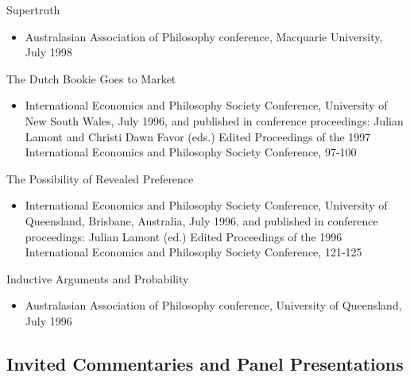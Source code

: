 \documentclass[
  10pt,
  letterpaper,
  DIV=11,
  numbers=noendperiod,
  twoside]{scrartcl}
\providecommand{\tightlist}{%
  \setlength{\itemsep}{0pt}\setlength{\parskip}{0pt}}\usepackage{longtable,booktabs,array}
\begin{document}
Supertruth

\begin{itemize}
\tightlist
\item
  Australasian Association of Philosophy conference, Macquarie
  University, July 1998
\end{itemize}

The Dutch Bookie Goes to Market

\begin{itemize}
\tightlist
\item
  International Economics and Philosophy Society Conference, University
  of New South Wales, July 1996, and published in conference
  proceedings: Julian Lamont and Christi Dawn Favor (eds.) Edited
  Proceedings of the 1997 International Economics and Philosophy Society
  Conference, 97-100
\end{itemize}

The Possibility of Revealed Preference

\begin{itemize}
\tightlist
\item
  International Economics and Philosophy Society Conference, University
  of Queensland, Brisbane, Australia, July 1996, and published in
  conference proceedings: Julian Lamont (ed.) Edited Proceedings of the
  1996 International Economics and Philosophy Society Conference,
  121-125
\end{itemize}

\newpage

Inductive Arguments and Probability

\begin{itemize}
\tightlist
\item
  Australasian Association of Philosophy conference, University of
  Queensland, July 1996
\end{itemize}

\subsection{Invited Commentaries and Panel
Presentations}\label{invited-commentaries-and-panel-presentations}
\end{document}
